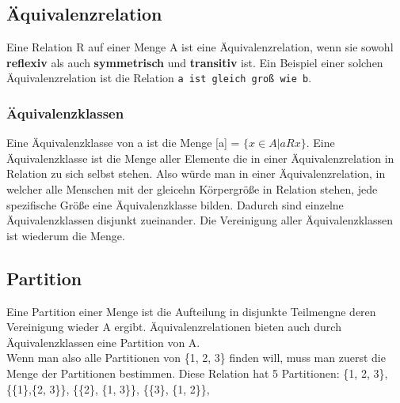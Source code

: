 \documentclass{article}
\begin{document}
	 \subsection{Äquivalenzrelation}
	 Eine Relation R auf einer Menge A ist eine Äquivalenzrelation, wenn sie sowohl \textbf{reflexiv} als auch \textbf{symmetrisch} und \textbf{transitiv} ist. Ein Beispiel einer solchen Äquivalenzrelation ist die Relation \verb|a ist gleich groß wie b|. \\
	 \subsubsection{Äquivalenzklassen}
	 Eine Äquivalenzklasse von a ist die Menge [a] = $\{x\in A|aRx\}$. Eine Äquivalenzklasse ist die Menge aller Elemente die in einer Äquivalenzrelation in Relation zu sich selbst stehen. Also würde man in einer Äquivalenzrelation, in welcher alle Menschen mit der gleicehn Körpergröße in Relation stehen, jede spezifische Größe eine Äquivalenzklasse bilden. Dadurch sind einzelne Äquivalenzklassen disjunkt zueinander. Die Vereinigung aller Äquivalenzklassen ist wiederum die Menge.
	 \subsection{Partition}
	 Eine Partition einer Menge ist die Aufteilung in disjunkte Teilmengne deren Vereinigung wieder A ergibt. Äquivalenzrelationen bieten auch durch Äquivalenzklassen eine Partition von A. \\
	 Wenn man also alle Partitionen von \{1, 2, 3\} finden will, muss man zuerst die Menge der Partitionen bestimmen. Diese Relation hat 5 Partitionen: \{1, 2, 3\}, \{\{1\},\{2, 3\}\}, \{\{2\}, \{1, 3\}\}, \{\{3\}, \{1, 2\}\},
\end{document}
